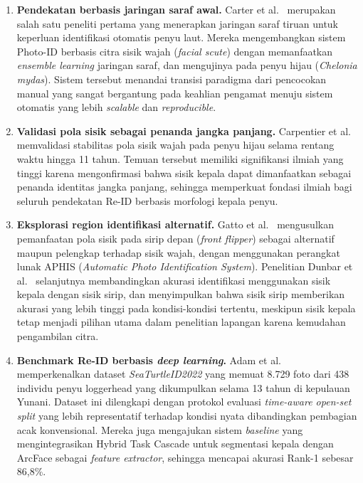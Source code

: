 \begin{enumerate}
\item \textbf{Pendekatan berbasis jaringan saraf awal.}
Carter et al.\ \cite{carter2014automated} merupakan salah satu peneliti pertama yang menerapkan jaringan saraf tiruan untuk keperluan identifikasi otomatis penyu laut. Mereka mengembangkan sistem Photo-ID berbasis citra sisik wajah (\textit{facial scute}) dengan memanfaatkan \textit{ensemble learning} jaringan saraf, dan mengujinya pada penyu hijau (\textit{Chelonia mydas}). Sistem tersebut menandai transisi paradigma dari pencocokan manual yang sangat bergantung pada keahlian pengamat menuju sistem otomatis yang lebih \textit{scalable} dan \textit{reproducible}.

\item \textbf{Validasi pola sisik sebagai penanda jangka panjang.}
Carpentier et al.\ \cite{carpentier2016stability} memvalidasi stabilitas pola sisik wajah pada penyu hijau selama rentang waktu hingga 11 tahun. Temuan tersebut memiliki signifikansi ilmiah yang tinggi karena mengonfirmasi bahwa sisik kepala dapat dimanfaatkan sebagai penanda identitas jangka panjang, sehingga memperkuat fondasi ilmiah bagi seluruh pendekatan Re-ID berbasis morfologi kepala penyu.
 
\item \textbf{Eksplorasi region identifikasi alternatif.}
Gatto et al.\ \cite{gatto2018flipper} mengusulkan pemanfaatan pola sisik pada sirip depan (\textit{front flipper}) sebagai alternatif maupun pelengkap terhadap sisik wajah, dengan menggunakan perangkat lunak APHIS (\textit{Automatic Photo Identification System}). Penelitian Dunbar et al.\ \cite{dunbar2023photo} selanjutnya membandingkan akurasi identifikasi menggunakan sisik kepala dengan sisik sirip, dan menyimpulkan bahwa sisik sirip memberikan akurasi yang lebih tinggi pada kondisi-kondisi tertentu, meskipun sisik kepala tetap menjadi pilihan utama dalam penelitian lapangan karena kemudahan pengambilan citra.
 
\item \textbf{Benchmark Re-ID berbasis \textit{deep learning}.}
Adam et al.\ \cite{adam2023seaturtleid2022} memperkenalkan dataset \textit{SeaTurtleID2022} yang memuat 8.729 foto dari 438 individu penyu loggerhead yang dikumpulkan selama 13 tahun di kepulauan Yunani. Dataset ini dilengkapi dengan protokol evaluasi \textit{time-aware open-set split} yang lebih representatif terhadap kondisi nyata dibandingkan pembagian acak konvensional. Mereka juga mengajukan sistem \textit{baseline} yang mengintegrasikan Hybrid Task Cascade untuk segmentasi kepala dengan ArcFace sebagai \textit{feature extractor}, sehingga mencapai akurasi Rank-1 sebesar 86{,}8\%.
 

\end{enumerate}
